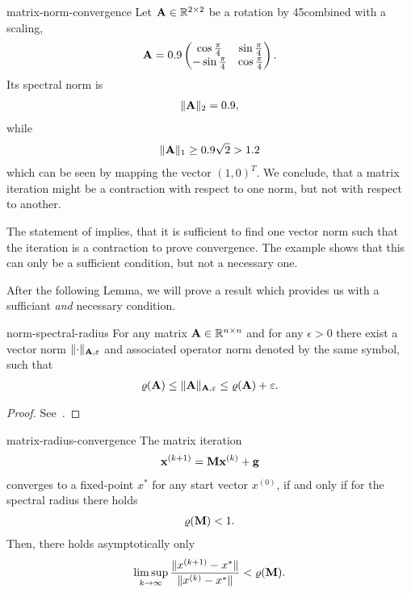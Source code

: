 \begin{Example}{matrix-norm-convergence}
  Let $\mathbf A\in\mathbb R^{2\times 2}$ be a rotation by 45\textdegree combined
  with a scaling,
  \begin{gather}
    \mathbf A = 0.9
    \begin{pmatrix}
      \cos \tfrac\pi4 &\sin\tfrac\pi4\\
      -\sin\tfrac\pi4&\cos\tfrac\pi4
    \end{pmatrix}.
  \end{gather}
  Its spectral norm is
  \begin{gather}
    \lVert\mathbf A\rVert_2 = 0.9,
  \end{gather}
  while
  \begin{gather}
    \lVert\mathbf A\rVert_1 \ge 0.9\sqrt2 > 1.2
  \end{gather}
  which can be seen by mapping the vector $(1,0)^T$. We conclude, that
  a matrix iteration might be a contraction with respect to one norm,
  but not with respect to another.
\end{Example}

\begin{remark}
  The statement of 
  implies, that it is sufficient to find one vector norm such that the
  iteration is a contraction to prove convergence. The example shows
  that this can only be a sufficient condition, but not a necessary
  one.

  After the following Lemma, we will prove a result which provides us
  with a sufficiant \emph{and} necessary condition.
\end{remark}

\begin{Lemma}{norm-spectral-radius}
  For any matrix $\mathbf A\in\mathbb R^{n\times n}$ and for any $\epsilon>0$ there exist a
  vector norm $\lVert\cdot\rVert_{\mathbf A,\varepsilon}$ and associated operator norm
  denoted by the same symbol, such that
  \begin{gather}
    \varrho(\mathbf A) \le \lVert\mathbf A\rVert_{\mathbf A,\varepsilon} \le \varrho(\mathbf A)+\varepsilon.
  \end{gather}
\end{Lemma}

\begin{proof}
  See~\cite[Lemma 3.1]{Rannacher18nla}.
\end{proof}

\begin{Theorem}{matrix-radius-convergence}
  The matrix iteration
  \begin{gather}
    \mathbf x^{(k+1)} = \mathbf M \mathbf x^{(k)} + \mathbf g
  \end{gather}
  converges to a fixed-point $x^*$ for any start vector $x^{(0)}$,
  if and only if for the spectral radius there holds
  \begin{gather}
    \varrho(\mathbf M) < 1.
  \end{gather}
  Then, there holds asymptotically only
  \begin{gather}
    \operatorname*{lim\,sup}_{k\to\infty} \frac{\lVert x^{(k+1)}-x^*\rVert}{\lVert x^{(k)}-x^*\rVert}
    < \varrho(\mathbf M).
  \end{gather}
\end{Theorem}

